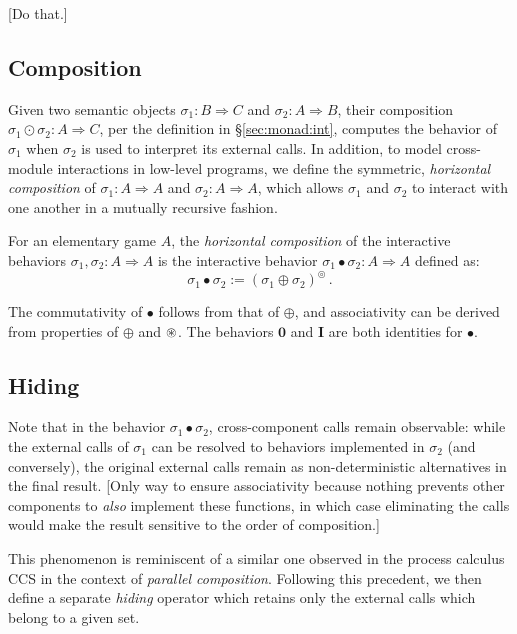 \documentclass[acmsmall,timestamp,review,anonymous]{acmart}
\begin{document}
[Do that.]


\subsection{Composition} \label{sec:modsem:comp} %

Given two semantic objects
$\sigma_1 : B \Rightarrow C$ and
$\sigma_2 : A \Rightarrow B$,
their composition $\sigma_1 \odot \sigma_2 : A \Rightarrow C$,
per the definition in \S\ref{sec:monad:int},
computes the behavior of $\sigma_1$ when $\sigma_2$ is used
to interpret its external calls.
In addition,
to model cross-module interactions in low-level programs,
we define the symmetric,
\emph{horizontal composition}
of
$\sigma_1 : A \Rightarrow A$ and
$\sigma_2 : A \Rightarrow A$,
which allows $\sigma_1$ and $\sigma_2$
to interact with one another
in a mutually recursive fashion.

\begin{definition}
For an elementary game $A$,
the \emph{horizontal composition} of the interactive behaviors
$\sigma_1, \sigma_2 : A \Rightarrow A$
is the interactive behavior
$\sigma_1 \bullet \sigma_2 : A \Rightarrow A$
defined as:
\[
    \sigma_1 \bullet \sigma_2 :=
      (\sigma_1 \oplus \sigma_2)^\circledcirc \,.
\]
\end{definition}

The commutativity of $\bullet$ follows from that of $\oplus$,
and associativity can be derived from properties of $\oplus$ and $\oast$.
The behaviors $\mathbf{0}$ and $\mathbf{I}$
are both identities for $\bullet$.


\subsection{Hiding} %

Note that
in the behavior $\sigma_1 \bullet \sigma_2$,
cross-component calls remain observable:
while the external calls of $\sigma_1$
can be resolved to behaviors implemented in $\sigma_2$
(and conversely),
the original external calls remain
as non-deterministic alternatives in the final result.
[Only way to ensure associativity
because nothing prevents other components
to \emph{also} implement these functions,
in which case eliminating the calls
would make the result sensitive to the order of composition.]

This phenomenon is reminiscent of a similar one observed
in the process calculus CCS \cite{ccs}
in the context of \emph{parallel composition}.
Following this precedent,
we then define a separate \emph{hiding} operator
which retains only the external calls
which belong to a given set.
\end{document}

